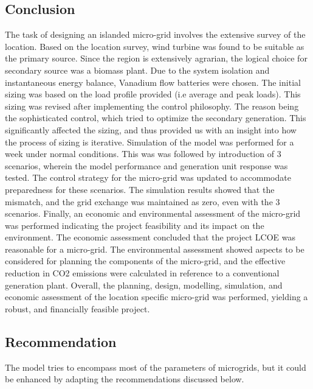 \subsection*{Conclusion}
The task of designing an islanded micro-grid involves the extensive survey of the location. Based on the location survey, wind turbine was found to be suitable as the primary source. Since the region is extensively agrarian, the logical choice for secondary source was a biomass plant. Due to the system isolation and instantaneous energy balance, Vanadium flow batteries were chosen. The initial sizing was based on the load profile provided (i.e average and peak loads). This sizing was revised after implementing the control philosophy. The reason being the sophisticated control, which tried to optimize the secondary generation. This significantly affected the sizing, and thus provided us with an insight into how the process of sizing is iterative. Simulation of the model was performed for a week under normal conditions. This was was followed by introduction of 3 scenarios, wherein the model performance and generation unit response was tested. The control strategy for the micro-grid was updated to accommodate preparedness for these scenarios. The simulation results showed that the mismatch, and the grid exchange was maintained as zero, even with the 3 scenarios. Finally, an economic and environmental assessment of the micro-grid was performed indicating the project feasibility and its impact on the environment. The economic assessment concluded that the project LCOE was reasonable for a micro-grid. The environmental assessment showed aspects to be considered for planning the components of the micro-grid, and the effective reduction in CO2 emissions were calculated in reference to a conventional generation plant. Overall, the planning, design, modelling, simulation, and economic assessment of the location specific micro-grid was performed, yielding a robust, and financially feasible project.

\subsection*{Recommendation}
The model tries to encompass most of the parameters of microgrids, but it could be enhanced by adapting the recommendations discussed below.

